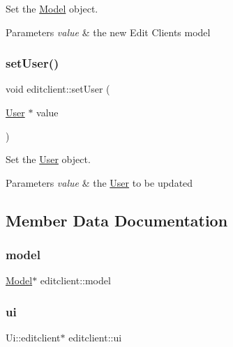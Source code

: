 Set the \hyperlink{classModel}{Model} object. 


\begin{DoxyParams}{Parameters}
{\em value} & the new Edit Client\textquotesingle{}s model \\
\hline
\end{DoxyParams}
\mbox{\label{classeditclient_acc61aaf32845af5f061c565e15ee14cc}} 
\subsubsection{\texorpdfstring{set\+User()}{setUser()}}
{\footnotesize\ttfamily void editclient\+::set\+User (\begin{DoxyParamCaption}\item[{\hyperlink{classUser}{User} $\ast$}]{value }\end{DoxyParamCaption})}



Set the \hyperlink{classUser}{User} object. 


\begin{DoxyParams}{Parameters}
{\em value} & the \hyperlink{classUser}{User} to be updated \\
\hline
\end{DoxyParams}


\subsection{Member Data Documentation}
\mbox{\label{classeditclient_aaaf4f3349486a47f6e3a1ced0d5dcd64}} 
\subsubsection{\texorpdfstring{model}{model}}
{\footnotesize\ttfamily \hyperlink{classModel}{Model}$\ast$ editclient\+::model\hspace{0.3cm}{\ttfamily [private]}}

\mbox{\label{classeditclient_a675352f4a557aec3af37bd4fb5dfea60}} 
\subsubsection{\texorpdfstring{ui}{ui}}
{\footnotesize\ttfamily Ui\+::editclient$\ast$ editclient\+::ui\hspace{0.3cm}{\ttfamily [private]}}

